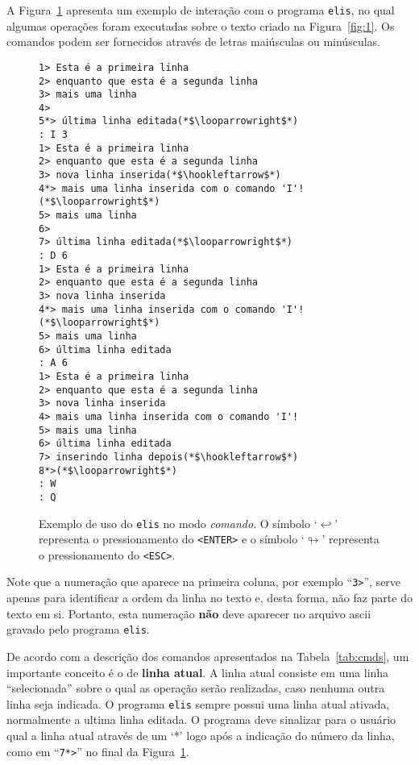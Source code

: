 \documentclass[11pt,a4paper]{article}
\begin{document}
A Figura~\ref{fig:2} apresenta um exemplo de interação com o programa \texttt{elis},
no qual algumas operações foram executadas sobre o texto criado na Figura~\ref{fig:1}.
Os comandos podem ser fornecidos através de letras maiúsculas ou minúsculas.

\begin{figure}[!ht]

\begin{lstlisting}[numbers=none]
1> Esta é a primeira linha
2> enquanto que esta é a segunda linha
3> mais uma linha
4>
5*> última linha editada(*$\looparrowright$*)
: I 3
1> Esta é a primeira linha
2> enquanto que esta é a segunda linha
3> nova linha inserida(*$\hookleftarrow$*)
4*> mais uma linha inserida com o comando 'I'!(*$\looparrowright$*)
5> mais uma linha
6>
7> última linha editada(*$\looparrowright$*)
: D 6
1> Esta é a primeira linha
2> enquanto que esta é a segunda linha
3> nova linha inserida
4*> mais uma linha inserida com o comando 'I'!(*$\looparrowright$*)
5> mais uma linha
6> última linha editada
: A 6
1> Esta é a primeira linha
2> enquanto que esta é a segunda linha
3> nova linha inserida
4> mais uma linha inserida com o comando 'I'!
5> mais uma linha
6> última linha editada
7> inserindo linha depois(*$\hookleftarrow$*)
8*>(*$\looparrowright$*)
: W
: Q
\end{lstlisting}
   \caption  {Exemplo de uso do \texttt{elis} no modo \textsl{comando}.
       O símbolo `$\hookleftarrow$' representa o pressionamento do \texttt{<ENTER>} e
       o símbolo `$\looparrowright$' representa o pressionamento do \texttt{<ESC>}.}
   \label{fig:2}
\end{figure}

Note que a numeração que aparece na primeira coluna, por exemplo  ``\texttt{3>}'',
serve apenas para identificar a ordem da linha no texto e, desta forma, não
faz parte do texto em si.
Portanto, esta numeração \textbf{não} deve aparecer no arquivo ascii gravado pelo programa
\texttt{elis}.

De acordo com a descrição dos comandos apresentados na Tabela~\ref{tab:cmds}, um
importante conceito é o de \textbf{linha atual}.
A linha atual consiste em uma linha ``selecionada'' sobre o qual as operação serão
realizadas, caso nenhuma outra linha seja indicada.
O programa \texttt{elis} sempre possui uma linha atual ativada, normalmente a ultima
linha editada.
O programa deve sinalizar para o usuário qual a linha atual através de um `*' logo
após a indicação do número da linha, como em ``\texttt{7*>}'' no final da Figura~\ref{fig:2}.
\end{document}
